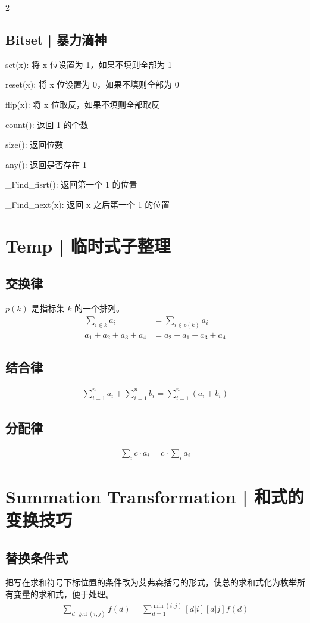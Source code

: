 \documentclass[8pt,a4paper]{article}
\newcommand{\txt}[1]{\par\noindent\footnotesize #1}
\begin{document}
\begin{multicols}{2}
    \subsection{Bitset | 暴力滴神}
        \txt{set(x): 将 x 位设置为 1，如果不填则全部为 1}
        \txt{reset(x): 将 x 位设置为 0，如果不填则全部为 0}
        \txt{flip(x): 将 x 位取反，如果不填则全部取反}
        \txt{count(): 返回 1 的个数}
        \txt{size(): 返回位数}
        \txt{any(): 返回是否存在 1}
        \txt{\_Find\_fisrt(): 返回第一个 1 的位置}
        \txt{\_Find\_next(x): 返回 x 之后第一个 1 的位置}

\section{Temp | 临时式子整理}

    \subsection{交换律}
    $p(k)$ 是指标集 $k$ 的一个排列。
    \begin{align*}
        \sum_{i \in k} a_i &= \sum_{i \in p(k)} a_i \\
        a_1 + a_2 + a_3 + a_4 &= a_2 + a_1 + a_3 + a_4
    \end{align*}

    \subsection{结合律}
    \begin{align*}
        \sum_{i=1}^{n} a_i + \sum_{i=1}^{n} b_i = \sum_{i=1}^{n} (a_i + b_i)
    \end{align*}

    \subsection{分配律}
    \begin{align*}
        \sum_{i} c \cdot a_i = c \cdot \sum_{i} a_i
    \end{align*}


\section{Summation Transformation | 和式的变换技巧}
    \subsection{替换条件式}
    把写在求和符号下标位置的条件改为艾弗森括号的形式，使总的求和式化为枚举所有变量的求和式，便于处理。
    \begin{align*}
        \sum_{d|\gcd(i,j)} f(d) = \sum_{d=1}^{\min(i,j)} [d|i][d|j]f(d)
    \end{align*}


\end{multicols}
\end{document}
